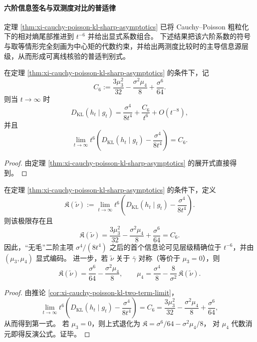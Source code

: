 

\paragraph{六阶信息签名与双测度对比的普适律}\label{para:xi-poisson-sixth-order-audit-laws}
定理 \ref{thm:xi-cauchy-poisson-kl-sharp-asymptotics} 已将 Cauchy--Poisson 粗粒化下的相对熵尾部推进到 \(t^{-6}\) 并给出显式系数组合。
下述结果把该六阶系数的符号与取等情形完全刻画为中心矩的代数约束，并给出两测度比较时的主导信息源层级，从而形成可离线核验的普适判别式。

\begin{corollary}[相对熵二项锐渐近的极限等价式]\label{cor:xi-cauchy-poisson-kl-two-term-limit}
在定理 \ref{thm:xi-cauchy-poisson-kl-sharp-asymptotics} 的条件下，记
\[
C_6:=\frac{3\mu_3^2}{32}-\frac{\sigma^2\mu_4}{8}+\frac{\sigma^6}{64}.
\]
则当 \(t\to\infty\) 时
\[
D_{\mathrm{KL}}(h_t\mid g_t)=\frac{\sigma^4}{8t^4}+\frac{C_6}{t^6}+O(t^{-8}),
\]
并且
\[
\lim_{t\to\infty}t^6\!\left(D_{\mathrm{KL}}(h_t\mid g_t)-\frac{\sigma^4}{8t^4}\right)=C_6.
\]
\end{corollary}
\begin{proof}
由定理 \ref{thm:xi-cauchy-poisson-kl-sharp-asymptotics} 的展开式直接得到。
\end{proof}

\begin{corollary}\label{cor:xi-cauchy-poisson-entropy-curvature-invariant}
在定理 \ref{thm:xi-cauchy-poisson-kl-sharp-asymptotics} 的条件下，定义
\[
\mathfrak K(\tilde\nu)
:=\lim_{t\to\infty}
t^6\!\left(D_{\mathrm{KL}}(h_t\mid g_t)-\frac{\sigma^4}{8t^4}\right).
\]
则该极限存在且
\[
\boxed{\;
\mathfrak K(\tilde\nu)
=\frac{3\mu_3^2}{32}-\frac{\sigma^2\mu_4}{8}+\frac{\sigma^6}{64}=C_6.\;}
\]
因此，“无毛”二阶主项 \(\sigma^4/(8t^4)\) 之后的首个信息论可见层级精确位于 \(t^{-6}\)，并由 \((\mu_3,\mu_4)\) 显式编码。
进一步，若 \(\tilde\nu\) 关于 \(\bar\gamma\) 对称（等价于 \(\mu_3=0\)），则
\[
\mathfrak K(\tilde\nu)=\frac{\sigma^6}{64}-\frac{\sigma^2\mu_4}{8},
\qquad
\mu_4=\frac{\sigma^4}{8}-\frac{8}{\sigma^2}\,\mathfrak K(\tilde\nu).
\]
\end{corollary}
\begin{proof}
由推论 \ref{cor:xi-cauchy-poisson-kl-two-term-limit}，
\[
\lim_{t\to\infty}
t^6\!\left(D_{\mathrm{KL}}(h_t\mid g_t)-\frac{\sigma^4}{8t^4}\right)
=C_6
=\frac{3\mu_3^2}{32}-\frac{\sigma^2\mu_4}{8}+\frac{\sigma^6}{64},
\]
从而得到第一式。
若 \(\mu_3=0\)，则上式退化为
\(
\mathfrak K=\sigma^6/64-\sigma^2\mu_4/8
\)，
对 \(\mu_4\) 代数消元即得反演公式。证毕。
\end{proof}

